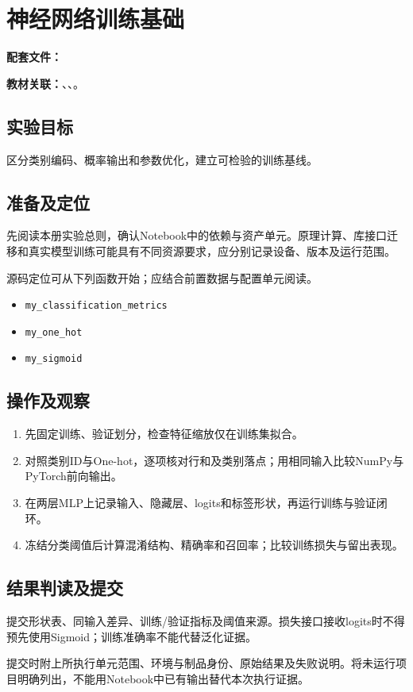 \chapter{神经网络训练基础}
\label{lab:10_foundations}

\noindent\textbf{配套文件：}\par
\noindent\textbf{教材关联：}、、。

\section*{实验目标}
区分类别编码、概率输出和参数优化，建立可检验的训练基线。

\section*{准备及定位}
先阅读本册实验总则，确认Notebook中的依赖与资产单元。原理计算、库接口迁移和真实模型训练可能具有不同资源要求，应分别记录设备、版本及运行范围。

源码定位可从下列函数开始；应结合前置数据与配置单元阅读。
\begin{itemize}
\item \texttt{my\_classification\_metrics}
\item \texttt{my\_one\_hot}
\item \texttt{my\_sigmoid}
\end{itemize}

\section*{操作及观察}
\begin{enumerate}
\item 先固定训练、验证划分，检查特征缩放仅在训练集拟合。
\item 对照类别ID与One-hot，逐项核对行和及类别落点；用相同输入比较NumPy与PyTorch前向输出。
\item 在两层MLP上记录输入、隐藏层、logits和标签形状，再运行训练与验证闭环。
\item 冻结分类阈值后计算混淆结构、精确率和召回率；比较训练损失与留出表现。
\end{enumerate}

\section*{结果判读及提交}
提交形状表、同输入差异、训练/验证指标及阈值来源。损失接口接收logits时不得预先使用Sigmoid；训练准确率不能代替泛化证据。

提交时附上所执行单元范围、环境与制品身份、原始结果及失败说明。将未运行项目明确列出，不能用Notebook中已有输出替代本次执行证据。
